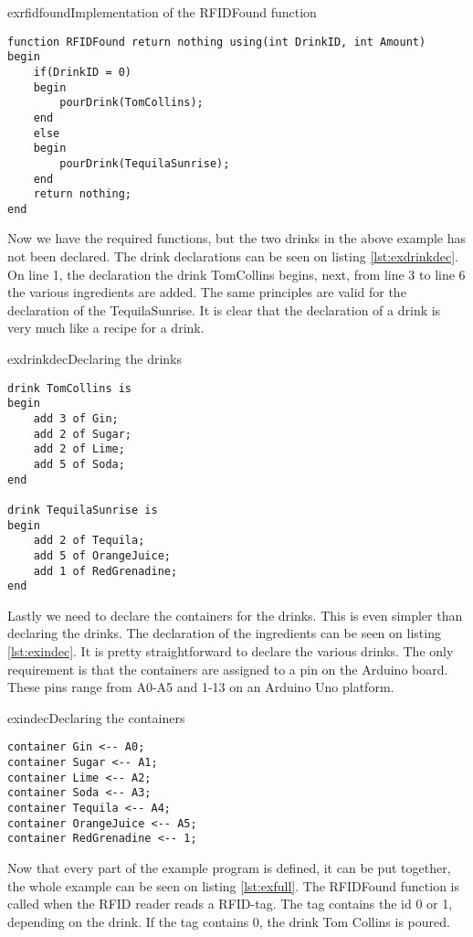 \begin{code}{exrfidfound}{Implementation of the RFIDFound function}
\begin{lstlisting}
function RFIDFound return nothing using(int DrinkID, int Amount)
begin
	if(DrinkID = 0)
	begin
		pourDrink(TomCollins);
	end
	else
	begin
		pourDrink(TequilaSunrise);
	end
	return nothing;
end
\end{lstlisting}
\end{code}

Now we have the required functions, but the two drinks in the above example has not been declared. The drink declarations can be seen on listing \ref{lst:exdrinkdec}. On line 1, the declaration the drink TomCollins begins, next, from line 3 to line 6 the various ingredients are added. The same principles are valid for the declaration of the TequilaSunrise. It is clear that the declaration of a drink is very much like a recipe for a drink. 

\begin{code}{exdrinkdec}{Declaring the drinks}
\begin{lstlisting}
drink TomCollins is
begin
	add 3 of Gin;
	add 2 of Sugar;
	add 2 of Lime;
	add 5 of Soda;
end

drink TequilaSunrise is 
begin
	add 2 of Tequila;
	add 5 of OrangeJuice;
	add 1 of RedGrenadine;
end
\end{lstlisting}
\end{code}

Lastly we need to declare the containers for the drinks. This is even simpler than declaring the drinks. The declaration of the ingredients can be seen on listing \ref{lst:exindec}. It is pretty straightforward to declare the various drinks. The only requirement is that the containers are assigned to a pin on the Arduino board. These pins range from A0-A5 and 1-13 on an Arduino Uno platform.

\begin{code}{exindec}{Declaring the containers}
\begin{lstlisting}
container Gin <-- A0;
container Sugar <-- A1;
container Lime <-- A2;
container Soda <-- A3;
container Tequila <-- A4;
container OrangeJuice <-- A5;
container RedGrenadine <-- 1;
\end{lstlisting}
\end{code}

Now that every part of the example program is defined, it can be put together, the whole example can be seen on listing \ref{lst:exfull}. The RFIDFound function is called when the RFID reader reads a RFID-tag. The tag contains the id 0 or 1, depending on the drink. If the tag contains 0, the drink Tom Collins is poured. 

